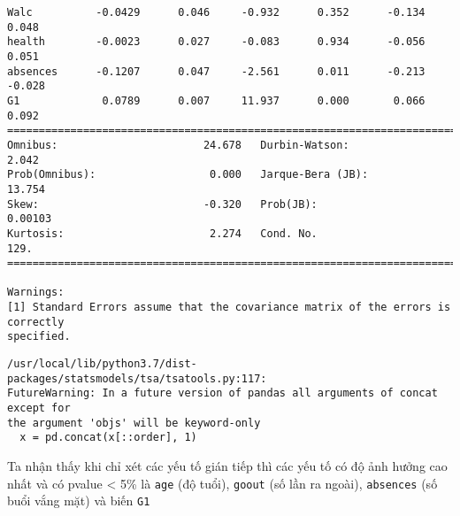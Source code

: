 \begin{Verbatim}[commandchars=\\\{\}]
Walc          -0.0429      0.046     -0.932      0.352      -0.134       0.048
health        -0.0023      0.027     -0.083      0.934      -0.056       0.051
absences      -0.1207      0.047     -2.561      0.011      -0.213      -0.028
G1             0.0789      0.007     11.937      0.000       0.066       0.092
==============================================================================
Omnibus:                       24.678   Durbin-Watson:                   2.042
Prob(Omnibus):                  0.000   Jarque-Bera (JB):               13.754
Skew:                          -0.320   Prob(JB):                      0.00103
Kurtosis:                       2.274   Cond. No.                         129.
==============================================================================

Warnings:
[1] Standard Errors assume that the covariance matrix of the errors is correctly
specified.
    \end{Verbatim}

    \begin{Verbatim}[commandchars=\\\{\}]
/usr/local/lib/python3.7/dist-packages/statsmodels/tsa/tsatools.py:117:
FutureWarning: In a future version of pandas all arguments of concat except for
the argument 'objs' will be keyword-only
  x = pd.concat(x[::order], 1)
    \end{Verbatim}

    Ta nhận thấy khi chỉ xét các yếu tố gián tiếp thì các yếu tố có độ ảnh
hưởng cao nhất và có pvalue \textless{} 5\% là \texttt{age} (độ tuổi),
\texttt{goout} (số lần ra ngoài), \texttt{absences} (số buổi vắng mặt)
và biến \texttt{G1}


